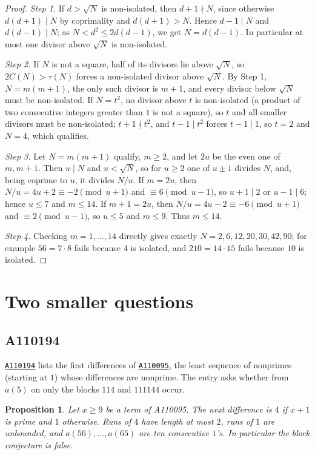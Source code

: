 \documentclass[11pt,a4paper]{article}
\newtheorem{proposition}[theorem]{Proposition}
\theoremstyle{remark}
\newcommand{\oeis}[1]{\href{https://oeis.org/#1}{\texttt{#1}}}
\begin{document}
\begin{proof}
\emph{Step 1.} If $d>\sqrt N$ is non-isolated, then $d+1\nmid N$, since otherwise $d(d+1)\mid N$ by coprimality and $d(d+1)>N$. Hence $d-1\mid N$ and $d(d-1)\mid N$; as $N<d^2\le2d(d-1)$, we get $N=d(d-1)$. In particular at most one divisor above $\sqrt N$ is non-isolated.

\emph{Step 2.} If $N$ is not a square, half of its divisors lie above $\sqrt N$, so $2C(N)>\tau(N)$ forces a non-isolated divisor above $\sqrt N$. By Step 1, $N=m(m+1)$, the only such divisor is $m+1$, and every divisor below $\sqrt N$ must be non-isolated. If $N=t^2$, no divisor above $t$ is non-isolated (a product of two consecutive integers greater than $1$ is not a square), so $t$ and all smaller divisors must be non-isolated; $t+1\nmid t^2$, and $t-1\mid t^2$ forces $t-1\mid1$, so $t=2$ and $N=4$, which qualifies.

\emph{Step 3.} Let $N=m(m+1)$ qualify, $m\ge2$, and let $2u$ be the even one of $m,m+1$. Then $u\mid N$ and $u<\sqrt N$, so for $u\ge2$ one of $u\pm1$ divides $N$, and, being coprime to $u$, it divides $N/u$. If $m=2u$, then $N/u=4u+2\equiv-2\pmod{u+1}$ and $\equiv6\pmod{u-1}$, so $u+1\mid2$ or $u-1\mid6$; hence $u\le7$ and $m\le14$. If $m+1=2u$, then $N/u=4u-2\equiv-6\pmod{u+1}$ and $\equiv2\pmod{u-1}$, so $u\le5$ and $m\le9$. Thus $m\le14$.

\emph{Step 4.} Checking $m=1,\dots,14$ directly gives exactly $N=2,6,12,20,30,42,90$; for example $56=7\cdot8$ fails because $4$ is isolated, and $210=14\cdot15$ fails because $10$ is isolated.
\end{proof}

\section{Two smaller questions}\label{sec:small}

\subsection{A110194}

\oeis{A110194} lists the first differences of \oeis{A110095}, the least sequence of nonprimes (starting at $1$) whose differences are nonprime. The entry asks whether from $a(5)$ on only the blocks $114$ and $111144$ occur.

\begin{proposition}
Let $x\ge9$ be a term of A110095. The next difference is $4$ if $x+1$ is prime and $1$ otherwise. Runs of $4$ have length at most $2$, runs of $1$ are unbounded, and $a(56),\dots,a(65)$ are ten consecutive $1$'s. In particular the block conjecture is false.
\end{proposition}
\end{document}
